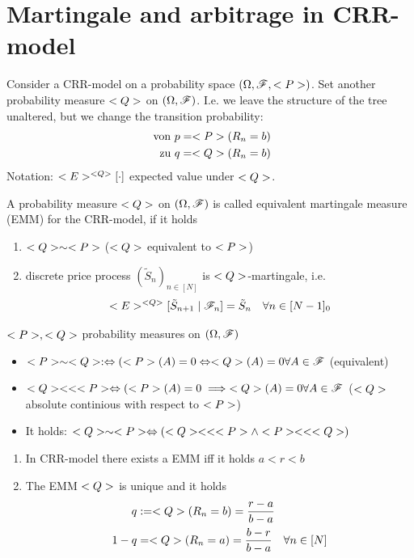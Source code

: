 \section{Martingale and arbitrage in CRR-model}
Consider a CRR-model on a probability space $(\O,\F,\P)$. Set another probability measure $\QQ$ on $(\O,\F)$. I.e. we leave the structure of the tree unaltered, but we change the transition probability:
\begin{align*}
	\text{ von }p = \P(R_n = b)\\
	\text{ zu }q = \QQ(R_n = b)
\end{align*}
Notation: $\E^{\QQ}[\cdot]$ expected value under $\QQ$.
\begin{definition}
	A probability measure $\QQ$ on $(\O,\F)$ is called equivalent martingale measure (EMM) for the CRR-model, if it holds
	\begin{enumerate}
		\item $\QQ\sim \P$ ($\QQ$ equivalent to $\P$)
		\item discrete price process $(\tilde{S}_n)_{n \in [N]}$ is $\QQ$-martingale, i.e.
		\begin{align*}
			\E^{\QQ}[\tilde{S}_{n+1}\mid \F_n] = \tilde{S}_n \quad \forall n \in [N-1]_0
		\end{align*}
	\end{enumerate}
\end{definition}
\begin{erinnerung}
	$\P, \QQ$ probability measures on $(\O,\F)$
	\begin{itemize}
		\item $\P \sim \QQ :\Leftrightarrow (\P(A) = 0 \Leftrightarrow \QQ(A) = 0 \forall A \in \F$ (equivalent)
		\item $\QQ << \P \Leftrightarrow (\P(A) = 0 \implies \QQ(A) = 0 \forall A \in \F$ ($\QQ$ absolute continious with respect to $\P$)
		\item It holds: $\QQ \sim \P \Leftrightarrow (\QQ << \P \wedge \P << \QQ)$
	\end{itemize}
\end{erinnerung}
\begin{theorem}
	\begin{enumerate}
		\item In CRR-model there exists a EMM iff it holds $a < r < b$
		\item The EMM $\QQ$ is unique and it holds
		\begin{align*}
			q &:= \QQ(R_n = b) = \frac{r-a}{b-a}\\
			1-q &= \QQ(R_n = a) = \frac{b-r}{b-a} \quad \forall n \in [N]
		\end{align*}
	\end{enumerate}
\end{theorem}
